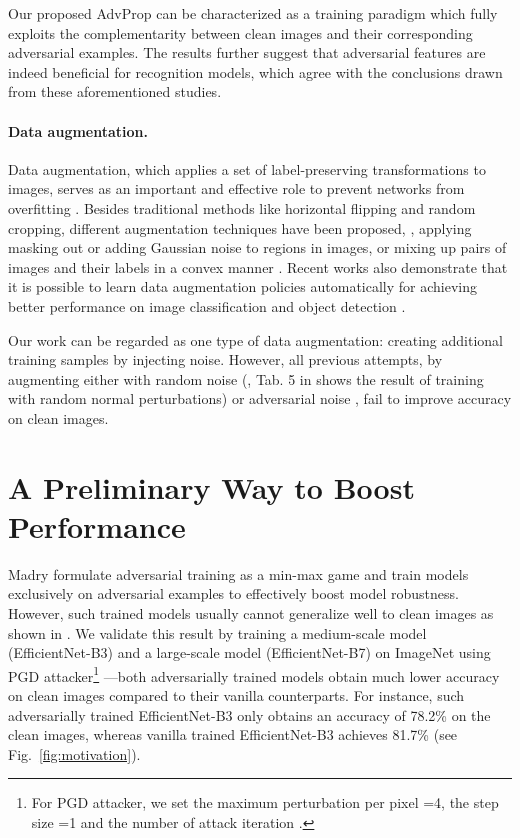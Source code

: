 \documentclass[10pt,twocolumn,letterpaper]{article}
\begin{document}
Our proposed AdvProp can be characterized as a training paradigm which fully exploits the complementarity between clean images and their corresponding adversarial examples. The results further suggest that adversarial features are indeed beneficial for recognition models, which agree  with the conclusions drawn from these aforementioned studies.


\paragraph{Data augmentation.} Data augmentation, which applies a set of label-preserving transformations to images, serves as an important and effective role to prevent networks from overfitting \cite{Krizhevsky2012,Simonyan2015,He2016}. Besides traditional methods like horizontal flipping and random cropping, different augmentation techniques have been proposed, \eg, applying masking out \cite{Devries2017} or adding Gaussian noise \cite{lopes2019improving} to regions in images, or mixing up pairs of images and their labels in a convex manner \cite{Zhang2017a}. Recent works also demonstrate that it is possible to learn data augmentation policies automatically for achieving better performance on image classification \cite{Cubuk2018,Cubuk2019,Lemley2017,Lim2019,zhang2019adversarial} and object detection \cite{Zoph2019,Cubuk2019}.


Our work can be regarded as one type of data augmentation: creating additional training samples by injecting noise. However, all previous attempts, by augmenting either with random noise (\eg, Tab. 5 in \cite{Kurakin2017} shows the result of training with random normal perturbations) or adversarial noise \cite{Kannan2018,Kurakin2017,Tramer2018}, fail to improve accuracy on clean images.


\section{A Preliminary Way to Boost Performance}
\label{sec:simple_strategy}
Madry \etal \cite{Madry2018} formulate adversarial training as a min-max game and train models exclusively on adversarial examples to effectively boost model robustness. However, such trained models usually cannot generalize well to clean images as shown in \cite{Madry2018,Xie2019}. We validate this result by training a medium-scale model (EfficientNet-B3) and a large-scale model (EfficientNet-B7) on ImageNet using PGD attacker\footnote{For PGD attacker, we set the maximum perturbation per pixel =4, the step size =1 and the number of attack iteration .} \cite{Madry2018}---both adversarially trained models obtain much lower accuracy on clean images compared to their vanilla counterparts. For instance, such adversarially trained EfficientNet-B3 only obtains an accuracy of 78.2\% on the clean images, whereas vanilla trained EfficientNet-B3 achieves 81.7\% (see Fig.~\ref{fig:motivation}).
\end{document}
